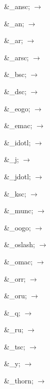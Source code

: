 \begin{multicols}{3}
\color{RViolet}%
\&{\textcompwordmark}\_ansc; $\rightarrow $

\&{\textcompwordmark}\_an; $\rightarrow $

\&{\textcompwordmark}\_ar; $\rightarrow $

\&{\textcompwordmark}\_arsc; $\rightarrow $

\&{\textcompwordmark}\_bsc; $\rightarrow $

\&{\textcompwordmark}\_dsc; $\rightarrow $

\&{\textcompwordmark}\_eogo; $\rightarrow $

\&{\textcompwordmark}\_emac; $\rightarrow $

\&\_{\textcompwordmark}idotl; $\rightarrow $

\&\_{\textcompwordmark}j; $\rightarrow $

\&\_{\textcompwordmark}jdotl; $\rightarrow $

\&\_{\textcompwordmark}ksc; $\rightarrow $

{\narrow\&\_{\textcompwordmark}munc; $\rightarrow $
}

\&\_{\textcompwordmark}oogo; $\rightarrow $

{\narrow\&\_{\textcompwordmark}oslash; $\rightarrow $
}

\&\_{\textcompwordmark}omac; $\rightarrow $

\&\_{\textcompwordmark}orr; $\rightarrow $

\&\_{\textcompwordmark}oru; $\rightarrow $

\&\_{\textcompwordmark}q; $\rightarrow $

\&\_{\textcompwordmark}ru; $\rightarrow $

\&\_{\textcompwordmark}tsc; $\rightarrow $

\&\_{\textcompwordmark}y; $\rightarrow $

{\narrow\&\_{\textcompwordmark}thorn; $\rightarrow $
}
\end{multicols}

